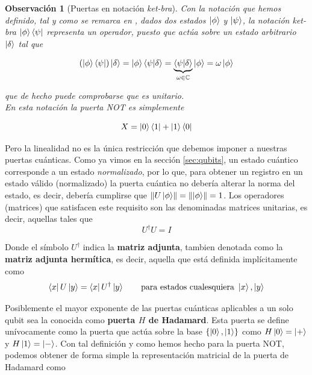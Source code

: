 \documentclass[11pt, spanish]{report}
\numberwithin{equation}{section}
\newtheorem{obs}[defin]{Observación}
\numberwithin{defin}{section}
\begin{document}
\begin{obs}[Puertas en notación \textit{ket-bra}]\label{holaOperador} Con la notación que hemos definido, tal y como se remarca en \cite{feynman1965lectures}, dados dos estados $\ket{\phi}$ y $\ket{\psi}$, la notación \textit{ket-bra} $\ket{\phi}\bra{\psi}$ representa un operador, puesto que actúa sobre un estado arbitrario $\ket{\delta}$ tal que

\begin{equation}
(\ket{\phi}\bra{\psi})\ket{\delta}=\ket{\phi}\bra{\psi}\ket{\delta}=\underbrace{\bra{\psi}\ket{\delta}}_{\omega\in\mathbb{C}}\ket{\phi}=\omega\ket{\phi}
\end{equation}

\noindent que de hecho puede comprobarse que es unitario. \\

En esta notación la puerta NOT es simplemente 

\begin{equation}
X=\ket{0}\bra{1}+\ket{1}\bra{0}
\end{equation}
\end{obs}

Pero la linealidad no es la única restricción que debemos imponer a nuestras puertas cuánticas. Como ya vimos en la sección \ref{sec:qubits}, un estado cuántico corresponde a un estado \emph{normalizado}, por lo que, para obtener un registro en un estado válido (normalizado) la puerta cuántica no debería alterar la norma del estado, es decir, debería cumplirse que $\norm{U\ket{\phi}}=\norm{\ket{\phi}}=1$. Los operadores (matrices) que satisfacen este requisito son las denominadas matrices unitarias, es decir, aquellas tales que 
\begin{equation}
U^{\dag}U=I
\end{equation}

Donde el símbolo $U^\dag$ indica la \textbf{matriz adjunta}, tambien denotada como la \textbf{matriz adjunta hermítica}, es decir, aquella que está definida implícitamente como 
\begin{equation}
\bra{x}U \ket{y} =\bra{x} U^\dag\ket{y} \qquad \text{para estados cualesquiera }\ket{x},\ket{y}
\end{equation}

Posiblemente el mayor exponente de las puertas cuánticas aplicables a un solo qubit sea la conocida como \textbf{puerta $H$ de Hadamard}. Esta puerta se define unívocamente como la puerta que actúa sobre la base $\{\ket{0},\ket{1}\}$ como $H\ket{0}=\ket{+}$ y $H\ket{1}=\ket{-}$. Con tal definición y como hemos hecho para la puerta NOT, podemos obtener de forma simple la representación matricial de la puerta de Hadamard como
\end{document}
